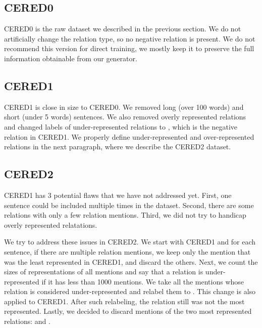 \subsection{CERED0}
CERED0 is the raw dataset we described in the previous section. We do not artificially change the relation type, so no negative relation is present. We do not recommend this version for direct training, we mostly keep it to preserve the full information obtainable from our generator.

\subsection{CERED1}
CERED1 is close in size to CERED0. We removed long (over 100 words) and short (under 5 words) sentences. We also removed overly represented relations and changed labels of under-represented relations to , which is the negative relation in CERED1. We properly define under-represented and over-represented relations in the next paragraph, where we describe the CERED2 dataset.

\subsection{CERED2}

CERED1 has 3 potential flaws that we have not addressed yet. First, one sentence could be included multiple times in the dataset. Second, there are some relations with only a few relation mentions. Third, we did not try to handicap overly represented relatations. 

We try to address these issues in CERED2. We start with CERED1 and for each sentence, if there are multiple relation mentions, we keep only the mention that was the least represented in CERED1, and discard the others. Next, we count the sizes of representations of all mentions and say that a relation is under-represented if it has less than \num{1000} mentions. We take all the mentions whose relation is considered under-represented and relabel them to . This change is also applied to CERED1. After such relabeling, the  relation still was not the most represented. Lastly, we decided to discard mentions of the two most represented relations:  and .

